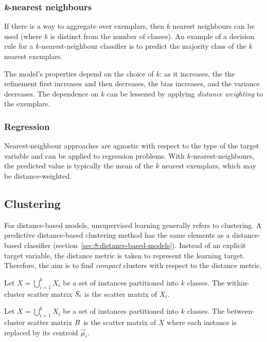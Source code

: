 \subsubsection{\textit{k}-nearest neighbours}

If there is a way to aggregate over exemplars, then $k$ nearest neighbours can
be used (where $k$ is distinct from the number of classes).
An example of a decision rule for a $k$-nearest-neighbour classifier is to
predict the majority class of the $k$ nearest exemplars.

The model's properties depend on the choice of $k$: as it increases, the
the refinement first increases and then decreases, the bias increases, and the
variance decreases.
The dependence on $k$ can be lessened by applying \textit{distance weighting}
to the exemplars.

\subsubsection{Regression}

Nearest-neighbour approaches are agnostic with respect to the type of the target
variable and can be applied to regression problems.
With $k$-nearest-neighbours, the predicted value is typically the mean of the
$k$ nearest exemplars, which may be distance-weighted.

\subsection{Clustering}
\label{sec:8:clustering}

For distance-based models, unsupervised learning generally refers to clustering.
A predictive distance-based clustering method has the same elements as a
distance-based classifier (section~\ref{sec:8:distance-based-models}).
Instead of an explicit target variable, the distance metric is taken to
represent the learning target.
Therefore, the aim is to find \textit{compact} clusters with respect to the
distance metric.

\begin{dfn}
  Let $X = \bigcup_{i = 1}^{k} X_i$ be a set of instances partitioned into $k$ classes.
  The within-cluster scatter matrix $S_i$ is the scatter matrix of $X_i$.
\end{dfn}

\begin{dfn}
  Let $X = \bigcup_{i = 1}^{k} X_i$ be a set of instances partitioned into $k$ classes.
  The between-cluster scatter matrix $B$ is the scatter matrix of $X$
  where each instance is replaced by its centroid $\vec{\mu}_i$.
\end{dfn}

